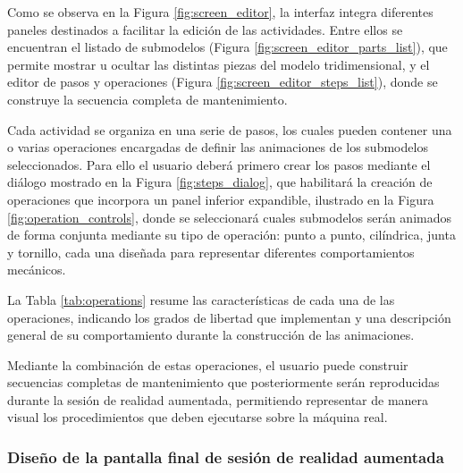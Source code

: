                 Como se observa en la Figura \ref{fig:screen_editor}, la interfaz integra diferentes paneles destinados a facilitar la edición de las actividades. Entre ellos se encuentran el listado de submodelos (Figura \ref{fig:screen_editor_parts_list}), que permite mostrar u ocultar las distintas piezas del modelo tridimensional, y el editor de pasos y operaciones (Figura \ref{fig:screen_editor_steps_list}), donde se construye la secuencia completa de mantenimiento.

                

                

                Cada actividad se organiza en una serie de pasos, los cuales pueden contener una o varias operaciones encargadas de definir las animaciones de los submodelos seleccionados. Para ello el usuario deberá primero crear los pasos mediante el diálogo mostrado en la Figura \ref{fig:steps_dialog}, que habilitará la creación de operaciones que incorpora un panel inferior expandible, ilustrado en la Figura \ref{fig:operation_controls}, donde se seleccionará cuales submodelos serán animados de forma conjunta mediante su tipo de operación: punto a punto, cilíndrica, junta y tornillo, cada una diseñada para representar diferentes comportamientos mecánicos.

                

                

                La Tabla \ref{tab:operations} resume las características de cada una de las operaciones, indicando los grados de libertad que implementan y una descripción general de su comportamiento durante la construcción de las animaciones.

                

                Mediante la combinación de estas operaciones, el usuario puede construir secuencias completas de mantenimiento que posteriormente serán reproducidas durante la sesión de realidad aumentada, permitiendo representar de manera visual los procedimientos que deben ejecutarse sobre la máquina real.

        \subsubsection{Diseño de la pantalla final de sesión de realidad aumentada}

